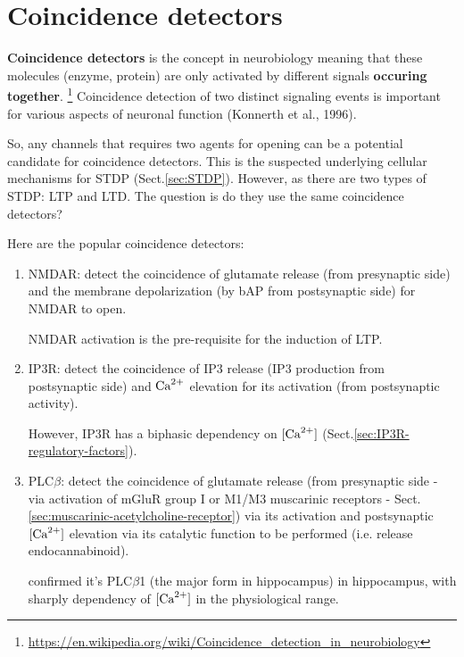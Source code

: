 \section{Coincidence detectors}
\label{sec:coincidence-detectors}

{\bf Coincidence detectors} is the concept in neurobiology meaning that these
molecules (enzyme, protein) are only activated by different signals {\bf
occuring together}.
\footnote{\url{https://en.wikipedia.org/wiki/Coincidence_detection_in_neurobiology}}
Coincidence detection of two distinct signaling events is important for various
aspects of neuronal function (Konnerth et al., 1996).

So, any channels that requires two agents for opening can be a potential 
candidate for coincidence detectors. This is the suspected underlying cellular
mechanisms for STDP (Sect.\ref{sec:STDP}).
However, as there are two types of STDP: LTP and LTD. The question is do they
use the same coincidence detectors?


Here are the popular coincidence detectors:

\begin{enumerate}
  \item NMDAR: detect the coincidence of glutamate release (from presynaptic
  side) and the membrane depolarization (by bAP from postsynaptic side)
  for NMDAR to open.
  
  NMDAR activation is the pre-requisite for the induction of LTP.
  
  \item IP3R: detect the coincidence of IP3 release (IP3 production from
  postsynaptic side) and ${\text{Ca}^{2+}}$ elevation for its activation (from postsynaptic
  activity). 
  
  However, IP3R has a biphasic dependency on $[{\text{Ca}^{2+}}]$
  (Sect.\ref{sec:IP3R-regulatory-factors}).
  
  \item PLC$\beta$: detect the coincidence of glutamate release (from
  presynaptic side - via activation of mGluR group I or M1/M3 muscarinic
  receptors - Sect.\ref{sec:muscarinic-acetylcholine-receptor}) 
  via its activation and postsynaptic $[{\text{Ca}^{2+}}]$ elevation via its catalytic
  function to be performed (i.e. release endocannabinoid).
  
  \citep{hashimotodani2005} confirmed it's PLC$\beta$1 (the major form in
  hippocampus) in hippocampus, with sharply dependency of $[{\text{Ca}^{2+}}]$ in the
  physiological range.
  
\end{enumerate}



